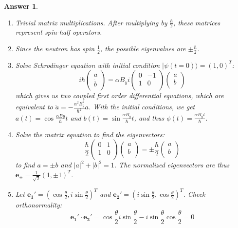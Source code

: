 \documentclass[a4paper]{article}
\newtheorem{ans}{Answer}[subsection]
\theoremstyle{new}
\begin{document}
\begin{ans}\leavevmode
\begin{enumerate}[label=(\roman*)]
\item Trivial matrix multiplications. After multiplying by $\frac{\hbar}{2}$, these matrices represent spin-half operators.
\item Since the neutron has spin $\frac{1}{2}$, the possible eigenvalues are $\pm\frac{\hbar}{2}$.
\item Solve Schrodinger equation with initial condition $|\psi(t=0)\rangle=(1,0)^T$:
$$i\hbar\begin{pmatrix}\dot{a}\\\dot{b}\\\end{pmatrix}=\alpha B_yi\begin{pmatrix}0&-1\\1&0\\\end{pmatrix}\begin{pmatrix}a\\b\\\end{pmatrix}$$
which gives us two coupled first order differential equations, which are equivalent to $\ddot{a}=-\frac{\alpha^2B_y^2}{\hbar^2}a$. With the initial conditions, we get $a(t)=\cos\frac{\alpha By}{\hbar}t$ and $b(t)=\sin\frac{\alpha B_y}{\hbar}t$, and thus $\phi(t)=\frac{\alpha B_yt}{\hbar}$.
\item Solve the matrix equation to find the eigenvectors:
$$\frac{\hbar}{2}\begin{pmatrix}0&1\\1&0\\\end{pmatrix}\begin{pmatrix}a\\b\\\end{pmatrix}=\pm\frac{\hbar}{2}\begin{pmatrix}a\\b\\\end{pmatrix}$$
to find $a=\pm b$ and $|a|^2+|b|^2=1$. The normalized eigenvectors are thus $\mathbf{e_\pm}=\frac{1}{\sqrt{2}}(1,\pm 1)^T$.
\item Let $\mathbf{e_1'}=(\cos\frac{\theta}{2},i\sin\frac{\theta}{2})^T$ and $\mathbf{e_2'}=(i\sin\frac{\theta}{2},\cos\frac{\theta}{2})^T$.  Check orthonormality:
$$\mathbf{e_1'}\cdot\mathbf{e_2'}=\cos\frac{\theta}{2}i\sin\frac{\theta}{2}-i\sin\frac{\theta}{2}\cos\frac{\theta}{2}=0$$

\end{enumerate}
\end{ans}
\end{document}
